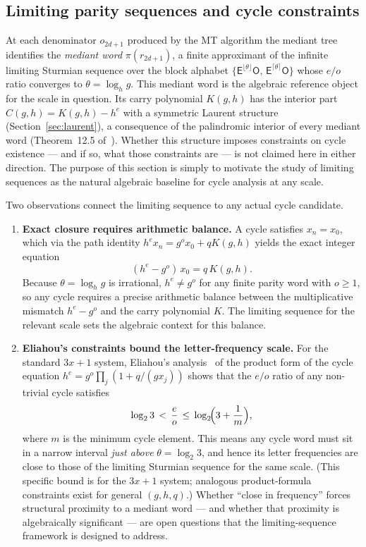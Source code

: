 \documentclass[12pt]{article}
\theoremstyle{definition}
\theoremstyle{remark}
\theoremstyle{plain}
\newcommand{\OO}{\mathsf{O}}
\newcommand{\EE}{\mathsf{E}}
\begin{document}
\subsection{Limiting parity sequences and cycle constraints}
\label{sec:palindrome-cycles}

At each denominator $o_{2d+1}$ produced by the MT algorithm the mediant tree
identifies the \emph{mediant word} $\pi(r_{2d+1})$, a finite approximant of
the infinite limiting Sturmian sequence over the block alphabet
$\{\EE^{\lfloor\theta\rfloor}\OO,\, \EE^{\lceil\theta\rceil}\OO\}$
whose $e/o$ ratio converges to $\theta = \log_h g$.
This mediant word is the algebraic reference object for the scale in
question.
Its carry polynomial $K(g,h)$ has the interior part $C(g,h) = K(g,h) - h^e$
with a symmetric Laurent structure (Section~\ref{sec:laurent}), a consequence
of the palindromic interior of every mediant word (Theorem~12.5
of~\cite{paper76}).
Whether this structure imposes constraints on cycle existence --- and if so,
what those constraints are --- is not claimed here in either direction.
The purpose of this section is simply to motivate the study of limiting
sequences as the natural algebraic baseline for cycle analysis at any scale.

Two observations connect the limiting sequence to any actual cycle candidate.

\begin{enumerate}
\item \textbf{Exact closure requires arithmetic balance.}
  A cycle satisfies $x_n = x_0$, which via the path identity
  $h^e x_n = g^o x_0 + q K(g,h)$ yields the exact integer equation
  \[
    (h^e - g^o)\, x_0 = q\, K(g,h).
  \]
  Because $\theta = \log_h g$ is irrational, $h^e \neq g^o$ for any finite
  parity word with $o \geq 1$, so any cycle requires a precise arithmetic balance
  between the multiplicative mismatch $h^e - g^o$ and the carry polynomial $K$.
  The limiting sequence for the relevant scale sets the algebraic context
  for this balance.

\item \textbf{Eliahou's constraints bound the letter-frequency scale.}
  For the standard $3x+1$ system, Eliahou's analysis~\cite{eliahou1993}
  of the product form of the cycle equation
  $h^e = g^o \prod_{j}(1 + q/(g x_j))$ shows that the $e/o$ ratio of any
  non-trivial cycle satisfies
  \[
    \log_2 3 \,<\, \frac{e}{o} \,\leq\, \log_2\!\Bigl(3 + \frac{1}{m}\Bigr),
  \]
  where $m$ is the minimum cycle element.
  This means any cycle word must sit in a narrow interval \emph{just above}
  $\theta = \log_2 3$, and hence its letter frequencies are close to those
  of the limiting Sturmian sequence for the same scale.
  (This specific bound is for the $3x+1$ system; analogous product-formula
  constraints exist for general $(g, h, q)$.)
  Whether ``close in frequency'' forces structural proximity to a mediant
  word --- and whether that proximity is algebraically significant --- are
  open questions that the limiting-sequence framework is designed to address.
\end{enumerate}
\end{document}
